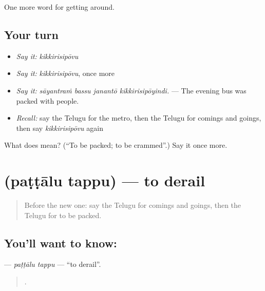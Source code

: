 \begin{grammarlens}[title={What you've built}]
One more word for getting around.
\end{grammarlens}

\subsection*{Your turn}
\begin{itemize}
\raggedright
  \item \emph{Say it:} \emph{kikkirisipōvu}
  \item \emph{Say it:} \emph{kikkirisipōvu}, once more
  \item \emph{Say it:} \emph{sāyantraṁ bassu janantō kikkirisipōyindi.} — The evening bus was packed with people.
  \item \emph{Recall:} say the Telugu for the metro, then the Telugu for comings and goings, then say \emph{kikkirisipōvu} again
\end{itemize}

\begin{tcolorbox}[breakable,colback=teal!4,colframe=teal!35!black,title={Before you move on}]
What does  mean? (\textquotedblleft{}To be packed; to be crammed\textquotedblright{}.) Say it once more.
\end{tcolorbox}
\section[\texorpdfstring{\te{పట్టాలు} \te{తప్పు} (paṭṭālu tappu)}{పట్టాలు తప్పు (paṭṭālu tappu)}]{  (paṭṭālu tappu) — to derail}

\label{lesson:TE-C442-pattalu-tappu}



\begin{quote}
Before the new one: say the Telugu for comings and goings, then the Telugu for to be packed.
\end{quote}

\subsection*{You'll want to know:  }
\textbf{ } — \emph{paṭṭālu tappu} — \textquotedblleft{}to derail\textquotedblright{}.

\begin{quote}
      .
\end{quote}

